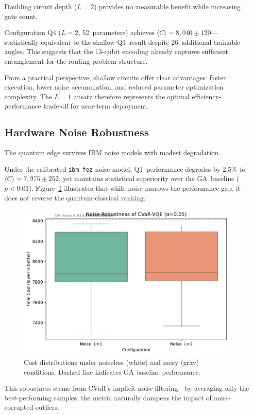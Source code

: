 Doubling circuit depth ($L=2$) provides no measurable benefit while increasing 
gate count.

Configuration Q4 ($L=2$, 52~parameters) achieves $\langle C\rangle=8{,}040\pm120$—statistically 
equivalent to the shallow Q1~result despite 26~additional trainable angles. 
This suggests that the 13-qubit encoding already captures sufficient entanglement 
for the routing problem structure.

From a practical perspective, shallow circuits offer clear advantages: faster 
execution, lower noise accumulation, and reduced parameter optimization complexity. 
The $L=1$ ansatz therefore represents the optimal efficiency-performance trade-off 
for near-term deployment.

\subsection{Hardware Noise Robustness}

The quantum edge survives IBM noise models with modest degradation.

Under the calibrated \texttt{ibm\_fez} noise model, Q1~performance degrades by 
2.5\% to $\langle C\rangle=7{,}975\pm252$, yet maintains statistical superiority 
over the GA~baseline ($p<0.01$). Figure~\ref{fig:noise} illustrates that while 
noise narrows the performance gap, it does not reverse the quantum-classical ranking.

\begin{figure}[h]
  \centering
  \includegraphics[width=.7\linewidth]{fig/noise_boxplot.pdf}
  \caption{Cost distributions under noiseless (white) and noisy (gray) conditions. 
           Dashed line indicates GA baseline performance.}
  \label{fig:noise}
\end{figure}

This robustness stems from CVaR's implicit noise filtering—by averaging only 
the best-performing samples, the metric naturally dampens the impact of 
noise-corrupted outliers.

